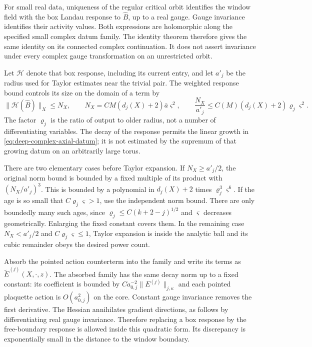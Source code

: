 \documentclass[11pt,letterpaper,reqno]{amsart}
\theoremstyle{definition}
\theoremstyle{remark}
\begin{document}
For small real data, uniqueness of the regular critical orbit
identifies the window field with the box Landau response to
$\widehat B$, up to a real gauge. Gauge invariance identifies
their activity values. Both expressions are holomorphic along
the specified small complex datum family. The identity theorem
therefore gives the same identity on its connected complex
continuation. It does not assert invariance under every complex
gauge transformation on an unrestricted orbit.

Let $\mathcal H$ denote that box response, including its
current entry, and let $a'_j$ be the radius used for Taylor
estimates near the trivial pair. The weighted response bound
controls its size on the domain of a term by
\begin{equation}\label{eq:deep-window-size}
 \|\mathcal H(\widehat B)\|_X\le N_X,
 \qquad N_X=CM(d_j(X)+2)\bar a\varsigma^2,
 \qquad
 \frac{N_X}{a'_j}
       \le C(M)(d_j(X)+2)\varrho_j\varsigma^2.
\end{equation}
The factor $\varrho_j$ is the ratio of output to older radius,
not a number of differentiating variables. The decay of the
response permits the linear growth in
\eqref{eq:deep-complex-axial-datum}; it is not estimated by
the supremum of that growing datum on an arbitrarily large
torus.

There are two elementary cases before Taylor expansion.
If $N_X\ge a'_j/2$, the original norm bound is bounded by
a fixed multiple of its product with $(N_X/a'_j)^3$.
This is bounded by a polynomial in $d_j(X)+2$ times
$\varrho_j^3\varsigma^6$. If the age is so small that
$C\varrho_j\varsigma>1$, use the independent norm bound.
There are only boundedly many such ages, since
$\varrho_j\le C(k+2-j)^{1/2}$ and $\varsigma$ decreases
geometrically. Enlarging the fixed constant covers them.
In the remaining case $N_X<a'_j/2$ and
$C\varrho_j\varsigma\le1$, Taylor expansion is inside the
analytic ball and its cubic remainder obeys the desired
power count.

Absorb the pointed action counterterm into the family and
write its terms as $\widetilde E^{(j)}(X,\cdot,z)$.
The absorbed family has the same decay norm up to a fixed
constant: its coefficient is bounded by
$Ca_{0,j}^{-2}\|E^{(j)}\|_{j,\kappa}$ and each pointed
plaquette action is $O(a_{0,j}^2)$ on the core. Constant
gauge invariance removes the first derivative. The Hessian
annihilates gradient directions, as follows by differentiating
real gauge invariance. Therefore replacing a box response by
the free-boundary response is allowed inside this quadratic
form. Its discrepancy is exponentially small in the distance
to the window boundary.
\end{document}
